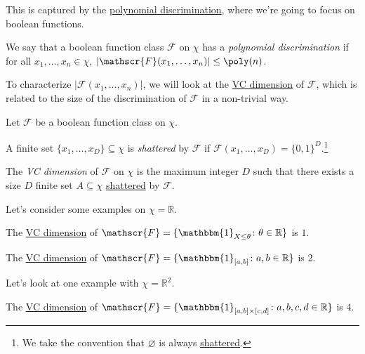 This is captured by the \hyperref[def:polynomial-discrimination]{polynomial discrimination}, where we're going to focus on boolean functions.

\begin{definition}\label{def:polynomial-discrimination}
	We say that a boolean function class \(\mathscr{F} \) on \(\chi \) has a \emph{polynomial discrimination} if for all \(x_1, \dots , x_n\in \chi \), \(\left\vert \mathscr{F} (x_1, \dots , x_n) \right\vert \leq \poly(n)\).
\end{definition}

To characterize \(\vert \mathscr{F} (x_1, \dots , x_n) \vert \), we will look at the \hyperref[def:VC-dimension]{VC dimension} of \(\mathscr{F} \), which is related to the size of the discrimination of \(\mathscr{F} \) in a non-trivial way.

\begin{definition*}
	Let \(\mathscr{F} \) be a boolean function class on \(\chi \).
	\begin{definition}[Shatter]\label{def:shatter}
		A finite set \(\{ x_1, \dots , x_D \} \subseteq \chi \) is \emph{shattered} by \(\mathscr{F} \) if \(\mathscr{F} (x_1, \dots , x_D) = \{ 0, 1 \} ^D\).\footnote{We take the convention that \(\varnothing \) is always \hyperref[def:shatter]{shattered}.}
	\end{definition}

	\begin{definition}\label{def:VC-dimension}
		The \emph{VC dimension} of \(\mathscr{F} \) on \(\chi \) is the maximum integer \(D\) such that there exists a size \(D\) finite set \(A \subseteq \chi \) \hyperref[def:shatter]{shattered} by \(\mathscr{F} \).
	\end{definition}
\end{definition*}

Let's consider some examples on \(\chi = \mathbb{R} \).

\begin{eg}
	The \hyperref[def:VC-dimension]{VC dimension} of \(\mathscr{F} = \{ \mathbbm{1}_{X \leq \theta } \colon \theta \in \mathbb{R} \} \) is \(1\).
\end{eg}

\begin{eg}\label{eg:VC-interval}
	The \hyperref[def:VC-dimension]{VC dimension} of \(\mathscr{F} = \{ \mathbbm{1}_{[a, b]} \colon a, b \in \mathbb{R}  \} \) is \(2\).
\end{eg}

Let's look at one example with \(\chi = \mathbb{R} ^2\).
\begin{eg}
	The \hyperref[def:VC-dimension]{VC dimension} of \(\mathscr{F} = \{ \mathbbm{1}_{[a, b]\times [c, d]} \colon a, b , c, d\in \mathbb{R} \} \) is \(4\).
\end{eg}